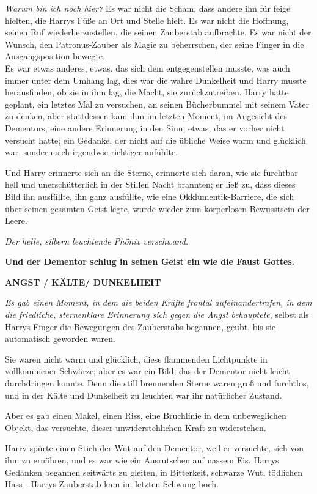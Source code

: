 {\emph{Warum bin ich noch hier?} Es war nicht die Scham, dass andere ihn für feige hielten, die Harrys Füße an Ort und Stelle hielt. Es war nicht die Hoffnung, seinen Ruf wiederherzustellen, die seinen Zauberstab aufbrachte. Es war nicht der Wunsch, den Patronus-Zauber als Magie zu beherrschen, der seine Finger in die Ausgangsposition bewegte.\\ Es war etwas anderes, etwas, das sich dem entgegenstellen musste, was auch immer unter dem Umhang lag, dies war die wahre Dunkelheit und Harry musste herausfinden, ob sie in ihm lag, die Macht, sie zurückzutreiben. Harry hatte geplant, ein letztes Mal zu versuchen, an seinen Bücherbummel mit seinem Vater zu denken, aber stattdessen kam ihm im letzten Moment, im Angesicht des Dementors, eine andere Erinnerung in den Sinn, etwas, das er vorher nicht versucht hatte; ein Gedanke, der nicht auf die übliche Weise warm und glücklich war, sondern sich irgendwie richtiger anfühlte.

Und Harry erinnerte sich an die Sterne, erinnerte sich daran, wie sie furchtbar hell und unerschütterlich in der Stillen Nacht brannten; er ließ zu, dass dieses Bild ihn ausfüllte, ihn ganz ausfüllte, wie eine Okklumentik-Barriere, die sich über seinen gesamten Geist legte, wurde wieder zum körperlosen Bewusstsein der Leere.

\emph{Der helle, silbern leuchtende Phönix verschwand.}

\textbf{Und der Dementor schlug in seinen Geist ein wie die Faust Gottes.}

\textbf{ANGST / KÄLTE/ DUNKELHEIT}

\emph{Es gab einen Moment, in dem die beiden Kräfte frontal aufeinandertrafen, in dem die friedliche, sternenklare Erinnerung sich gegen die Angst behauptete}, selbst als Harrys Finger die Bewegungen des Zauberstabs begannen, geübt, bis sie automatisch geworden waren.

Sie waren nicht warm und glücklich, diese flammenden Lichtpunkte in vollkommener Schwärze; aber es war ein Bild, das der Dementor nicht leicht durchdringen konnte. Denn die still brennenden Sterne waren groß und furchtlos, und in der Kälte und Dunkelheit zu leuchten war ihr natürlicher Zustand.

Aber es gab einen Makel, einen Riss, eine Bruchlinie in dem unbeweglichen Objekt, das versuchte, dieser unwiderstehlichen Kraft zu widerstehen.

Harry spürte einen Stich der Wut auf den Dementor, weil er versuchte, sich von ihm zu ernähren, und es war wie ein Ausrutschen auf nassem Eis. Harrys Gedanken begannen seitwärts zu gleiten, in Bitterkeit, schwarze Wut, tödlichen Hass - Harrys Zauberstab kam im letzten Schwung hoch.\\

}
